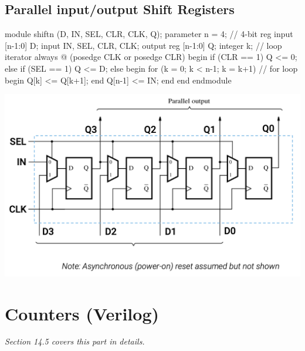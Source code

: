 \documentclass[12pt,openany]{book}
\begin{document}
\subsection{Parallel input/output Shift Registers}
\begin{minipage}{0.4\textwidth}
\begin{vhdl}
module shiftn (D, IN, SEL, CLR, CLK, Q);
	parameter n = 4; // 4-bit reg
	input [n-1:0] D;
	input IN, SEL, CLR, CLK;
	output reg [n-1:0] Q;
	integer k; // loop iterator
	always @ (posedge CLK or posedge CLR) begin
		if (CLR == 1) Q <= 0;
		else if (SEL == 1) Q <= D;
		else begin
			for (k = 0; k < n-1; k = k+1) // for loop
			begin
				Q[k] <= Q[k+1];
			end
			Q[n-1] <= IN;
		end
	end
endmodule
\end{vhdl}
\end{minipage}
\hfill
\hspace*{-2em}
\vline
\hfill
\hspace*{-4em}
\begin{minipage}{0.4\textwidth}
\includegraphics[width=1.3\textwidth]{circuits/14.3.2.png}
\end{minipage}

 

\section{Counters (Verilog)}
\vspace*{-10px}
\textit{Section 14.5 covers this part in details.}
\end{document}
